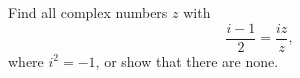 Find all complex numbers $z$ with
\[\dfrac{i-1}{2}=\dfrac{iz}{z},\]
where $i^2=-1$, or show that there are none.
